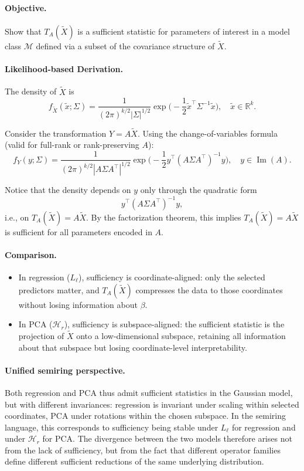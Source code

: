 \paragraph{Objective.}  
Show that \(T_A(\tilde{X})\) is a sufficient statistic for parameters of interest in a model class \(\mathcal{M}\) defined via a subset of the covariance structure of \(\tilde{X}\).

\paragraph{Likelihood-based Derivation.}  
The density of \(\tilde{X}\) is
\[
f_{\tilde{X}}(\tilde{x}; \Sigma) = \frac{1}{(2\pi)^{k/2} |\Sigma|^{1/2}} \exp\Big(-\frac{1}{2} \tilde{x}^\top \Sigma^{-1} \tilde{x}\Big), \quad \tilde{x} \in \mathbb{R}^k.
\]

Consider the transformation \(Y = A \tilde{X}\). Using the change-of-variables formula (valid for full-rank or rank-preserving \(A\)):
\[
f_Y(y; \Sigma) = \frac{1}{(2\pi)^{k/2} |A \Sigma A^\top|^{1/2}} \exp\Big(-\frac{1}{2} y^\top (A \Sigma A^\top)^{-1} y\Big), \quad y \in \operatorname{Im}(A).
\]

Notice that the density depends on \(y\) only through the quadratic form
\[
y^\top (A \Sigma A^\top)^{-1} y,
\]
i.e., on \(T_A(\tilde{X}) = A \tilde{X}\). By the factorization theorem, this implies $T_A(\tilde{X}) = A \tilde{X}$ is sufficient for all parameters encoded in $A$.

\paragraph{Comparison.}  
\begin{itemize}
    \item In regression ($L_\ell$), sufficiency is coordinate-aligned: only the selected predictors matter, and $T_A(\tilde{X})$ compresses the data to those coordinates without losing information about $\beta$.
    \item In PCA ($\mathcal{H}_r$), sufficiency is subspace-aligned: the sufficient statistic is the projection of $\tilde{X}$ onto a low-dimensional subspace, retaining all information about that subspace but losing coordinate-level interpretability.
\end{itemize}

\paragraph{Unified semiring perspective.}
Both regression and PCA thus admit sufficient statistics in the Gaussian model, but with different invariances: regression is invariant under scaling within selected coordinates, PCA under rotations within the chosen subspace. In the semiring language, this corresponds to sufficiency being stable under $L_\ell$ for regression and under $\mathcal{H}_r$ for PCA. The divergence between the two models therefore arises not from the lack of sufficiency, but from the fact that different operator families define different sufficient reductions of the same underlying distribution.